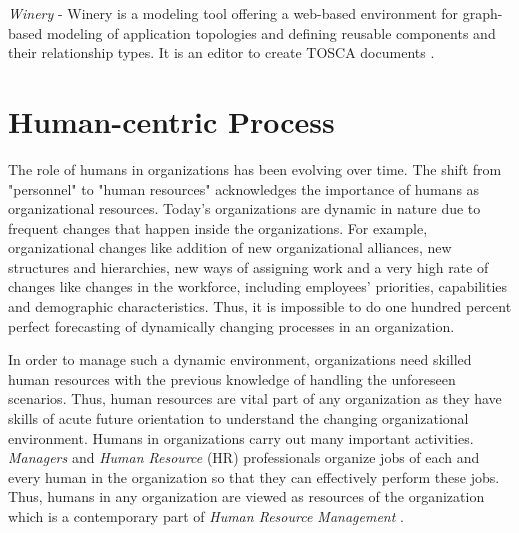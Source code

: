 \textit{Winery} - Winery is a modeling tool offering a web-based environment for graph-based modeling of application topologies and defining reusable components and their relationship types. It is an editor to create TOSCA documents \cite{Kopp2013}. 

\section{Human-centric Process}
\label{sec:humancentric}
The role of humans in organizations has been evolving over time. The shift from "personnel" to "human resources" acknowledges the importance of humans as organizational resources. Today's organizations are dynamic in nature due to frequent changes that happen inside the organizations. For example, organizational changes like addition of new organizational alliances, new structures and hierarchies, new ways of assigning work and a very high rate of changes like changes in the workforce, including employees' priorities, capabilities and demographic characteristics. Thus, it is impossible to do one hundred percent perfect forecasting of dynamically changing processes in an organization.

In order to manage such a dynamic environment, organizations need skilled human resources with the previous knowledge of handling the unforeseen scenarios. Thus, human resources are vital part of any organization as they have skills of acute future orientation to understand the changing organizational environment. Humans in organizations carry out many important activities. \textit{Managers} and \textit{Human Resource} (HR) professionals organize jobs of each and every human in the organization so that they can effectively perform these jobs. Thus, humans in any organization are viewed as resources of the organization which is a contemporary part of \textit{Human Resource Management} \cite{Bianca2016}.

